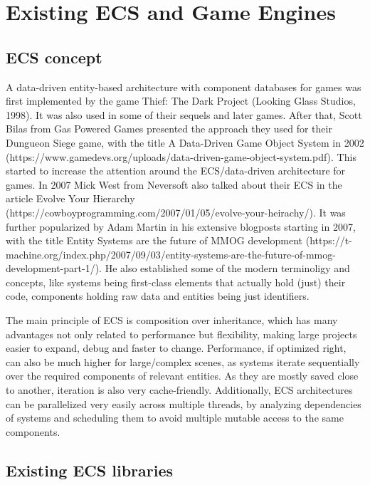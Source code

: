 \chapter{Existing ECS and Game Engines}\label{chap:engines}

\section{ECS concept}

A data-driven entity-based architecture with component databases for games was first implemented by the game \textsf{Thief: The Dark Project} (Looking Glass Studios, 1998). It was also used in some of their sequels and later games. After that, Scott Bilas from \textsf{Gas Powered Games} presented the approach they used for their \textsf{Dungueon Siege} game, with the title \textsf{A Data-Driven Game Object System} in 2002 (https://www.gamedevs.org/uploads/data-driven-game-object-system.pdf). This started to increase the attention around the ECS/data-driven architecture for games. In 2007 Mick West from Neversoft also talked about their ECS in the article \textsf{Evolve Your Hierarchy} (https://cowboyprogramming.com/2007/01/05/evolve-your-heirachy/). It was further popularized by Adam Martin in his extensive blogposts starting in 2007, with the title \textsf{Entity Systems are the future of MMOG development} (https://t-machine.org/index.php/2007/09/03/entity-systems-are-the-future-of-mmog-development-part-1/). He also established some of the modern terminoligy and concepts, like systems being first-class elements that actually hold (just) their code, components holding raw data and entities being just identifiers.

The main principle of ECS is composition over inheritance, which has many advantages not only related to performance but flexibility, making large projects easier to expand, debug and faster to change. Performance, if optimized right, can also be much higher for large/complex scenes, as systems iterate sequentially over the required components of relevant entities. As they are mostly saved close to another, iteration is also very cache-friendly. Additionally, ECS architectures can be parallelized very easily across multiple threads, by analyzing dependencies of systems and scheduling them to avoid multiple mutable access to the same components.

\section{Existing ECS libraries}

